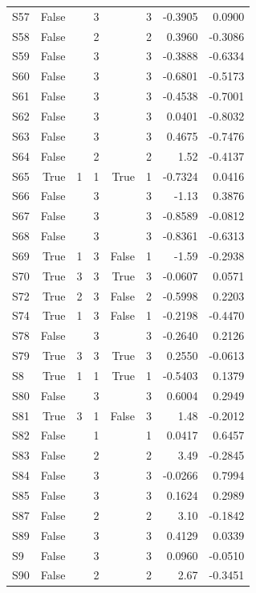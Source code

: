 {\begin{longtable}{lrrrrrrr}
  S57 & False &  & 3 &  & 3 & -0.3905 & 0.0900 \\
  S58 & False &  & 2 &  & 2 & 0.3960 & -0.3086 \\
  S59 & False &  & 3 &  & 3 & -0.3888 & -0.6334 \\
  S60 & False &  & 3 &  & 3 & -0.6801 & -0.5173 \\
  S61 & False &  & 3 &  & 3 & -0.4538 & -0.7001 \\
  S62 & False &  & 3 &  & 3 & 0.0401 & -0.8032 \\
  S63 & False &  & 3 &  & 3 & 0.4675 & -0.7476 \\
  S64 & False &  & 2 &  & 2 & 1.52 & -0.4137 \\
  S65 & True & 1 & 1 & True & 1 & -0.7324 & 0.0416 \\
  S66 & False &  & 3 &  & 3 & -1.13 & 0.3876 \\
  S67 & False &  & 3 &  & 3 & -0.8589 & -0.0812 \\
  S68 & False &  & 3 &  & 3 & -0.8361 & -0.6313 \\
  S69 & True & 1 & 3 & False & 1 & -1.59 & -0.2938 \\
  S70 & True & 3 & 3 & True & 3 & -0.0607 & 0.0571 \\
  S72 & True & 2 & 3 & False & 2 & -0.5998 & 0.2203 \\
  S74 & True & 1 & 3 & False & 1 & -0.2198 & -0.4470 \\
  S78 & False &  & 3 &  & 3 & -0.2640 & 0.2126 \\
  S79 & True & 3 & 3 & True & 3 & 0.2550 & -0.0613 \\
  S8 & True & 1 & 1 & True & 1 & -0.5403 & 0.1379 \\
  S80 & False &  & 3 &  & 3 & 0.6004 & 0.2949 \\
  S81 & True & 3 & 1 & False & 3 & 1.48 & -0.2012 \\
  S82 & False &  & 1 &  & 1 & 0.0417 & 0.6457 \\
  S83 & False &  & 2 &  & 2 & 3.49 & -0.2845 \\
  S84 & False &  & 3 &  & 3 & -0.0266 & 0.7994 \\
  S85 & False &  & 3 &  & 3 & 0.1624 & 0.2989 \\
  S87 & False &  & 2 &  & 2 & 3.10 & -0.1842 \\
  S89 & False &  & 3 &  & 3 & 0.4129 & 0.0339 \\
  S9 & False &  & 3 &  & 3 & 0.0960 & -0.0510 \\
  S90 & False &  & 2 &  & 2 & 2.67 & -0.3451 \\

\end{longtable}}
